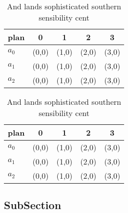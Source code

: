 \documentclass[a4paper]{article}
\begin{document}
\begin{table}
\begin{adjustbox}{width=0.6\columnwidth}
\begin{tabular}{|l|l|l|l|l|}
\hline
\textbf{plan} & \multicolumn{1}{c|}{\textbf{0}} & \multicolumn{1}{c|}{\textbf{1}} & \multicolumn{1}{c|}{\textbf{2}} & \multicolumn{1}{c|}{\textbf{3}} \\ \hline
\textbf{$a_0$}  & (0,0) & (1,0) & (2,0) & (3,0) \\ \hline
\textbf{$a_1$}  & (0,0) & (1,0) & (2,0) & (3,0) \\ \hline
\textbf{$a_2$}  & (0,0) & (1,0) & (2,0) & (3,0) \\ \hline
\end{tabular}
\end{adjustbox}
\caption{And lands sophisticated southern sensibility cent
}
\end{table}

\begin{table}
\begin{adjustbox}{width=0.6\columnwidth}
\begin{tabular}{|l|l|l|l|l|}
\hline
\textbf{plan} & \multicolumn{1}{c|}{\textbf{0}} & \multicolumn{1}{c|}{\textbf{1}} & \multicolumn{1}{c|}{\textbf{2}} & \multicolumn{1}{c|}{\textbf{3}} \\ \hline
\textbf{$a_0$}  & (0,0) & (1,0) & (2,0) & (3,0) \\ \hline
\textbf{$a_1$}  & (0,0) & (1,0) & (2,0) & (3,0) \\ \hline
\textbf{$a_2$}  & (0,0) & (1,0) & (2,0) & (3,0) \\ \hline
\end{tabular}
\end{adjustbox}
\caption{And lands sophisticated southern sensibility cent
}
\end{table}

\subsection{SubSection}
\end{document}
